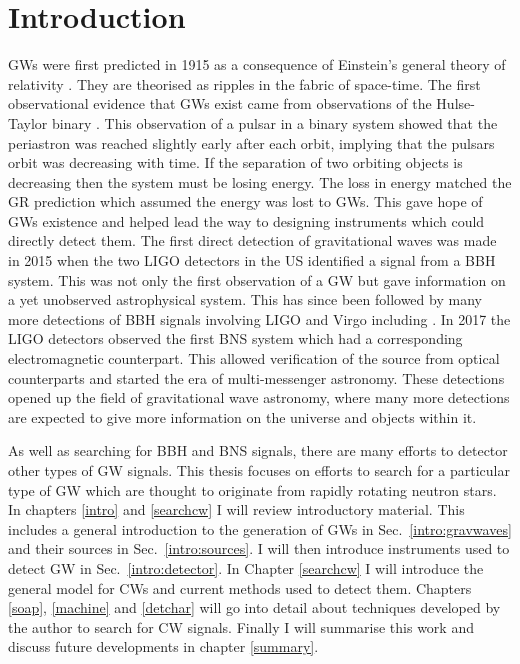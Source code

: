 \chapter{\label{intro}Introduction}


\Glspl{GW} were first predicted in 1915 as a consequence of Einstein's general theory of relativity \citep{einstein2005GrundlageAllgemeinen}.
They are theorised as ripples in the fabric of space-time.
The first observational evidence that \glspl{GW} exist came from observations of the Hulse-Taylor binary \citep{weisberg1981GravitationalWaves,weisberg2004RelativisticBinary}. 
This observation of a pulsar in a binary system showed that the periastron was reached slightly early after each orbit, implying that the pulsars orbit was decreasing with time. 
If the separation of two orbiting objects is decreasing then the system must be losing energy.
The loss in energy matched the \gls{GR} prediction which assumed the energy was lost to \glspl{GW}.
This gave hope of \glspl{GW} existence and helped lead the way to designing instruments which could directly detect them.
The first direct detection of gravitational waves was made in 2015 when the two \gls{LIGO} detectors in the US \citep{abbott2016ObservationGravitational} identified a signal from a \gls{BBH} system.
This was not only the first observation of a \gls{GW} but gave information on a yet unobserved astrophysical system.
This has since been followed by many more detections of \gls{BBH} signals involving \gls{LIGO} and Virgo including \citep{abbott2017GW170814ThreeDetector,theligoscientificcollaboration2020GW190425Observation}.
In 2017 the \gls{LIGO} detectors observed the first \gls{BNS} system \citep{abbott2017GW170817Observation} which had a corresponding electromagnetic counterpart.
This allowed verification of the source from optical counterparts and started the era of multi-messenger astronomy.
These detections opened up the field of gravitational wave astronomy, where many more detections are expected to give more information on the universe and objects within it.

As well as searching for \gls{BBH} and \gls{BNS} signals, there are many efforts to detector other types of \gls{GW} signals. 
This thesis focuses on efforts to search for a particular type of \gls{GW} which are thought to originate from rapidly rotating neutron stars.
In chapters \ref{intro} and \ref{searchcw} I will review introductory material. 
This includes a general introduction to the generation of \glspl{GW} in Sec.~\ref{intro:gravwaves} and their sources in Sec.~\ref{intro:sources}.
I will then introduce instruments used to detect \gls{GW} in Sec.~\ref{intro:detector}.
In Chapter \ref{searchcw} I will introduce the general model for \glspl{CW} and current methods used to detect them.
Chapters \ref{soap}, \ref{machine} and \ref{detchar} will go into detail about techniques developed by the author to search for \gls{CW} signals. 
Finally I will summarise this work and discuss future developments in chapter \ref{summary}.


